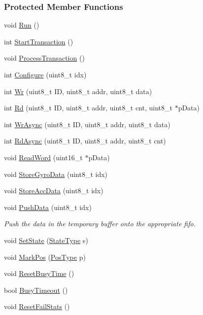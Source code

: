 \subsubsection*{Protected Member Functions}
\begin{DoxyCompactItemize}
\item 
void \hyperlink{class_i_m_u_aadf38b912ad23374c4ee8e40fb9f3638}{Run} ()
\item 
int \hyperlink{class_i_m_u_a8dfecb837ea9fcf9d190423dca9beb7f}{StartTransaction} ()
\item 
void \hyperlink{class_i_m_u_ac39f14c617d4eea9de6175497744465a}{ProcessTransaction} ()
\item 
int \hyperlink{class_i_m_u_af4bede5261a1d6018c72782d8c54445e}{Configure} (uint8\_\-t idx)
\item 
int \hyperlink{class_i_m_u_af80eef2eb22d08faf697dd708b18303c}{Wr} (uint8\_\-t ID, uint8\_\-t addr, uint8\_\-t data)
\item 
int \hyperlink{class_i_m_u_ab6c8ef618465524c88a021e2206b2de5}{Rd} (uint8\_\-t ID, uint8\_\-t addr, uint8\_\-t cnt, uint8\_\-t $\ast$pData)
\item 
int \hyperlink{class_i_m_u_a2c38589ebcb357dfc8f987a5d41c845b}{WrAsync} (uint8\_\-t ID, uint8\_\-t addr, uint8\_\-t data)
\item 
int \hyperlink{class_i_m_u_ad39e85995898b9251032c89a3587974c}{RdAsync} (uint8\_\-t ID, uint8\_\-t addr, uint8\_\-t cnt)
\item 
void \hyperlink{class_i_m_u_a07362afd858bca1ce960f3809248e4e9}{ReadWord} (uint16\_\-t $\ast$pData)
\item 
void \hyperlink{class_i_m_u_a5b58d543be70886335e439a2b4f28a8e}{StoreGyroData} (uint8\_\-t idx)
\item 
void \hyperlink{class_i_m_u_ae9c290e496eb2a76aefc626c81fe4da9}{StoreAccData} (uint8\_\-t idx)
\item 
void \hyperlink{class_i_m_u_a14f3437170b38602f281b3f97d9ce129}{PushData} (uint8\_\-t idx)
\begin{DoxyCompactList}\small\item\em Push the data in the temporary buffer onto the appropriate fifo. \item\end{DoxyCompactList}\item 
void \hyperlink{class_i_m_u_a5d80a28d98df12c536f525b56b7e5abe}{SetState} (\hyperlink{class_i_m_u_a7b5e1bf1cf1407b3e4cf0dd2e18b523f}{StateType} s)
\item 
void \hyperlink{class_i_m_u_a7f9a7744a4fa3ea40da008cabd5da7b7}{MarkPos} (\hyperlink{class_i_m_u_ad01128d82debc1e4213affe4858f3144}{PosType} p)
\item 
void \hyperlink{class_i_m_u_ab3992da77876e9b5cae8bc9d1334ff7b}{ResetBusyTime} ()
\item 
bool \hyperlink{class_i_m_u_a6a61733d65cf2b60db212e0be9a00fed}{BusyTimeout} ()
\item 
void \hyperlink{class_i_m_u_a89de27b845ce9e103436cfb7ae8e6441}{ResetFailStats} ()
\end{DoxyCompactItemize}

